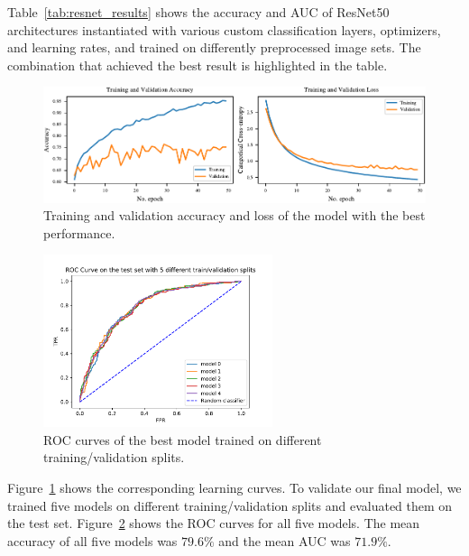 \documentclass[sn-mathphys,Numbered]{sn-jnl}%
\theoremstyle{thmstyleone}%
\theoremstyle{thmstyletwo}%
\theoremstyle{thmstylethree}%
\begin{document}
Table~\ref{tab:resnet_results} shows the accuracy and AUC of ResNet50 architectures instantiated with various custom classification layers, optimizers, and learning rates, and trained on differently preprocessed image sets. The combination that achieved the best result is highlighted in the table.
\begin{figure}[ht]%
\centering
\includegraphics[width=1.0\textwidth]{ResNet50_GlobalAvg_results.pdf}
\caption{Training and validation accuracy and loss of the model with the best performance.}
\label{fig:train_val_performance_resnet}
\end{figure}
\begin{figure}[ht]%
\centering
\includegraphics[width=0.6\textwidth]{final_ROC_ResNet50.pdf}
\caption{ROC curves of the best model trained on different training/validation splits.}
\label{fig:ROC_resnet}
\end{figure}
Figure~\ref{fig:train_val_performance_resnet} shows the corresponding learning curves. To validate our final model, we trained five models on different training/validation splits and evaluated them on the test set. Figure~\ref{fig:ROC_resnet} shows the ROC curves for all five models. The mean accuracy of all five models was $79.6\%$ and the mean AUC was $71.9\%$.
\end{document}
